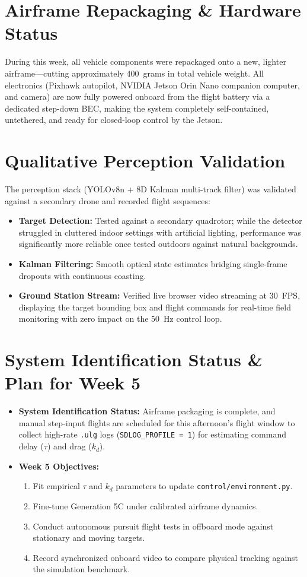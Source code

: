 \documentclass[11pt,a4paper]{article}
\begin{document}
\section{Airframe Repackaging \& Hardware Status}
During this week, all vehicle components were repackaged onto a new, lighter airframe---cutting approximately 400~grams in total vehicle weight. All electronics (Pixhawk autopilot, NVIDIA Jetson Orin Nano companion computer, and camera) are now fully powered onboard from the flight battery via a dedicated step-down BEC, making the system completely self-contained, untethered, and ready for closed-loop control by the Jetson.

\section{Qualitative Perception Validation}
The perception stack (YOLOv8n + 8D Kalman multi-track filter) was validated against a secondary drone and recorded flight sequences:
\begin{itemize}[leftmargin=1.5em, itemsep=0.2em]
    \item \textbf{Target Detection:} Tested against a secondary quadrotor; while the detector struggled in cluttered indoor settings with artificial lighting, performance was significantly more reliable once tested outdoors against natural backgrounds.
    \item \textbf{Kalman Filtering:} Smooth optical state estimates bridging single-frame dropouts with continuous coasting.
    \item \textbf{Ground Station Stream:} Verified live browser video streaming at 30~FPS, displaying the target bounding box and flight commands for real-time field monitoring with zero impact on the 50~Hz control loop.
\end{itemize}

\section{System Identification Status \& Plan for Week 5}
\begin{itemize}[leftmargin=1.5em, itemsep=0.2em]
    \item \textbf{System Identification Status:} Airframe packaging is complete, and manual step-input flights are scheduled for this afternoon's flight window to collect high-rate \texttt{.ulg} logs (\texttt{SDLOG\_PROFILE = 1}) for estimating command delay ($\tau$) and drag ($k_d$).
    \item \textbf{Week 5 Objectives:}
    \begin{enumerate}[leftmargin=1.2em, itemsep=0.1em]
        \item Fit empirical $\tau$ and $k_d$ parameters to update \texttt{control/environment.py}.
        \item Fine-tune Generation 5C under calibrated airframe dynamics.
        \item Conduct autonomous pursuit flight tests in offboard mode against stationary and moving targets.
        \item Record synchronized onboard video to compare physical tracking against the simulation benchmark.
    \end{enumerate}
\end{itemize}
\end{document}
